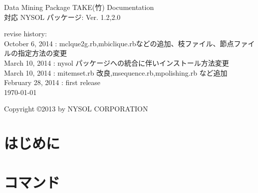 \documentclass[a4paper]{jsbook}
\begin{document}
\begin{titlepage}
\begin{center}
{\huge Data Mining Package TAKE(竹) Documentation}\\
\vspace{10truept}
{\normalsize 対応 NYSOL パッケージ: Ver. 1.2,2.0}\\
\vspace{1cm}

revise history:\\

October 6, 2014 : mclque2g.rb,mbiclique.rbなどの追加、枝ファイル、節点ファイルの指定方法の変更\\
March 10, 2014 : nysol パッケージへの統合に伴いインストール方法変更\\
March 10, 2014 : mitemset.rb 改良,msequence.rb,mpolishing.rb など追加\\
February 28, 2014 : first release\\
\vspace{18cm}
{\small \today}

{\small Copyright \copyright 2013 by NYSOL CORPORATION}
\end{center}
\end{titlepage}

\setcounter{tocdepth}{1}
\tableofcontents




\chapter{はじめに}


\chapter{コマンド}











%
%

\end{document}
